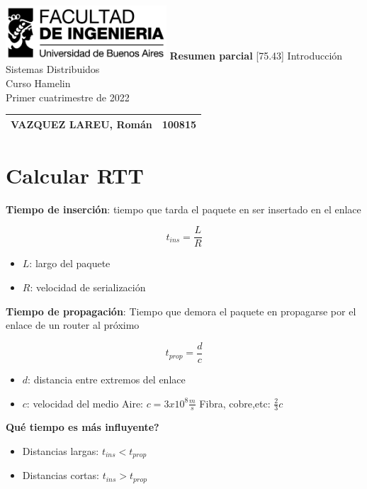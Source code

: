 \documentclass[titlepage,a4paper]{article}
\begin{document}
\begin{titlepage} %
	\hfill\includegraphics[width=6cm]{imagenes/logofiuba.jpg}
    \centering
    \vfill
    \Huge \textbf{Resumen parcial}
    \vskip2cm
    \Large [75.43]  Introducción Sistemas Distribuidos\\
    Curso Hamelin \\ 
    Primer cuatrimestre de 2022 
    \vfill
    \begin{tabular}{ | l | l | } %
      \hline
      VAZQUEZ LAREU, Román & 100815 \\ \hline
      

  	\end{tabular}
    \vfill
    \vfill
\end{titlepage}

\tableofcontents %
\newpage

\section{Calcular RTT}\label{sec:CalcularRTT}

\textbf{Tiempo de inserción}: tiempo que tarda el paquete en ser insertado en el enlace

$$t_{ins} = \frac{L}{R}$$ 

\begin{itemize}
    \item $L$: largo del paquete
    \item $R$: velocidad de serialización
\end{itemize}


\textbf{Tiempo de propagación}: Tiempo que demora el paquete en propagarse por el enlace de un router al próximo

$$t_{prop} = \frac{d}{c}$$

\begin{itemize}
    \item $d$: distancia entre extremos del enlace
    \item $c$: velocidad del medio
        \subitem Aire: $c = 3x10^8 \frac{m}{s}$
        \subitem Fibra, cobre,etc: $\frac{2}{3} c$ 
\end{itemize}


\textbf{Qué tiempo es más influyente?}
\begin{itemize}
    \item Distancias largas: $ t_{ins} <  t_{prop} $
    \item Distancias cortas: $ t_{ins} > t_{prop}$
\end{itemize}
\end{document}
